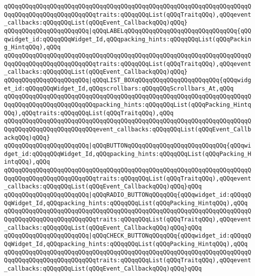 \verb|qQQqqQQqqQQqqQQqqQQqqQQqqQQqqQQqqQQqqQQqqQQqqQQqqQQqqQQqqQQqqQQqqQQqqQQqqQQqqQQqqQQqqQQqqQQqqQQqtraits:qQQqqQQqList(qQQqTraitqQQq),qQQqevent_callbacks:qQQqqQQqList(qQQqEvent_CallbackqQQq)qQQq}|\newline
\verb|qQQqqQQqqQQqqQQqqQQqqQQq|\verb#|qQQqLABELqQQqqQQqqQQqqQQqqQQqqQQqqQQqqQQq{qQQqwidget_id:qQQqqQQqWidget_Id,qQQqpacking_hints:qQQqqQQqList(qQQqPacking_HintqQQq),qQQq#\newline
\verb|qQQqqQQqqQQqqQQqqQQqqQQqqQQqqQQqqQQqqQQqqQQqqQQqqQQqqQQqqQQqqQQqqQQqqQQqqQQqqQQqqQQqqQQqqQQqqQQqtraits:qQQqqQQqList(qQQqTraitqQQq),qQQqevent_callbacks:qQQqqQQqList(qQQqEvent_CallbackqQQq)qQQq}|\newline
\verb|qQQqqQQqqQQqqQQqqQQqqQQq|\verb#|qQQqLIST_BOXqQQqqQQqqQQqqQQqqQQqqQQq{qQQqwidget_id:qQQqqQQqWidget_Id,qQQqscrollbars:qQQqqQQqScrollbars_At,qQQq#\newline
\verb|qQQqqQQqqQQqqQQqqQQqqQQqqQQqqQQqqQQqqQQqqQQqqQQqqQQqqQQqqQQqqQQqqQQqqQQqqQQqqQQqqQQqqQQqqQQqqQQqpacking_hints:qQQqqQQqList(qQQqPacking_HintqQQq),qQQqtraits:qQQqqQQqList(qQQqTraitqQQq),qQQq|\newline
\verb|qQQqqQQqqQQqqQQqqQQqqQQqqQQqqQQqqQQqqQQqqQQqqQQqqQQqqQQqqQQqqQQqqQQqqQQqqQQqqQQqqQQqqQQqqQQqqQQqevent_callbacks:qQQqqQQqList(qQQqEvent_CallbackqQQq)qQQq}|\newline
\verb|qQQqqQQqqQQqqQQqqQQqqQQq|\verb#|qQQqBUTTONqQQqqQQqqQQqqQQqqQQqqQQqqQQq{qQQqwidget_id:qQQqqQQqWidget_Id,qQQqpacking_hints:qQQqqQQqList(qQQqPacking_HintqQQq),qQQq#\newline
\verb|qQQqqQQqqQQqqQQqqQQqqQQqqQQqqQQqqQQqqQQqqQQqqQQqqQQqqQQqqQQqqQQqqQQqqQQqqQQqqQQqqQQqqQQqqQQqqQQqtraits:qQQqqQQqList(qQQqTraitqQQq),qQQqevent_callbacks:qQQqqQQqList(qQQqEvent_CallbackqQQq)qQQq}qQQq|\newline
\verb|qQQqqQQqqQQqqQQqqQQqqQQq|\verb#|qQQqRADIO_BUTTONqQQqqQQq{qQQqwidget_id:qQQqqQQqWidget_Id,qQQqpacking_hints:qQQqqQQqList(qQQqPacking_HintqQQq),qQQq#\newline
\verb|qQQqqQQqqQQqqQQqqQQqqQQqqQQqqQQqqQQqqQQqqQQqqQQqqQQqqQQqqQQqqQQqqQQqqQQqqQQqqQQqqQQqqQQqqQQqqQQqtraits:qQQqqQQqList(qQQqTraitqQQq),qQQqevent_callbacks:qQQqqQQqList(qQQqEvent_CallbackqQQq)qQQq}qQQq|\newline
\verb|qQQqqQQqqQQqqQQqqQQqqQQq|\verb#|qQQqCHECK_BUTTONqQQqqQQq{qQQqwidget_id:qQQqqQQqWidget_Id,qQQqpacking_hints:qQQqqQQqList(qQQqPacking_HintqQQq),qQQq#\newline
\verb|qQQqqQQqqQQqqQQqqQQqqQQqqQQqqQQqqQQqqQQqqQQqqQQqqQQqqQQqqQQqqQQqqQQqqQQqqQQqqQQqqQQqqQQqqQQqqQQqtraits:qQQqqQQqList(qQQqTraitqQQq),qQQqevent_callbacks:qQQqqQQqList(qQQqEvent_CallbackqQQq)qQQq}qQQq|\newline
